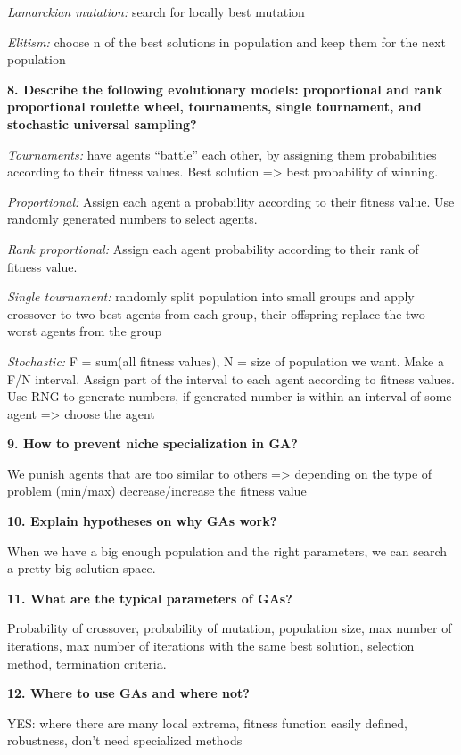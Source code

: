 \textit{Lamarckian mutation:} search for locally best mutation

\textit{Elitism:} choose n of the best solutions in population and
keep them for the next population

\textbf{8. Describe the following evolutionary models: proportional and
rank proportional roulette wheel, tournaments, single tournament, and
stochastic universal sampling?}

\textit{Tournaments:} have agents ``battle'' each other, by assigning
them probabilities according to their fitness values. Best solution
=\textgreater{} best probability of winning.

\textit{Proportional:} Assign each agent a probability according to
their fitness value. Use randomly generated numbers to select agents.

\textit{Rank proportional:} Assign each agent probability according
to their rank of fitness value.

\textit{Single tournament:} randomly split population into small
groups and apply crossover to two best agents from each group, their
offspring replace the two worst agents from the group

\textit{Stochastic:} F = sum(all fitness values), N = size of
population we want. Make a F/N interval. Assign part of the interval to
each agent according to fitness values. Use RNG to generate numbers, if
generated number is within an interval of some agent =\textgreater{}
choose the agent

\textbf{9. How to prevent niche specialization in GA?}

We punish agents that are too similar to others =\textgreater{}
depending on the type of problem (min/max) decrease/increase the fitness
value

\textbf{10. Explain hypotheses on why GAs work?}

When we have a big enough population and the right parameters, we can
search a pretty big solution space.

\textbf{11. What are the typical parameters of GAs?}

Probability of crossover, probability of mutation, population size, max
number of iterations, max number of iterations with the same best
solution, selection method, termination criteria.

\textbf{12. Where to use GAs and where not?}

YES: where there are many local extrema, fitness function easily
defined, robustness, don't need specialized methods

